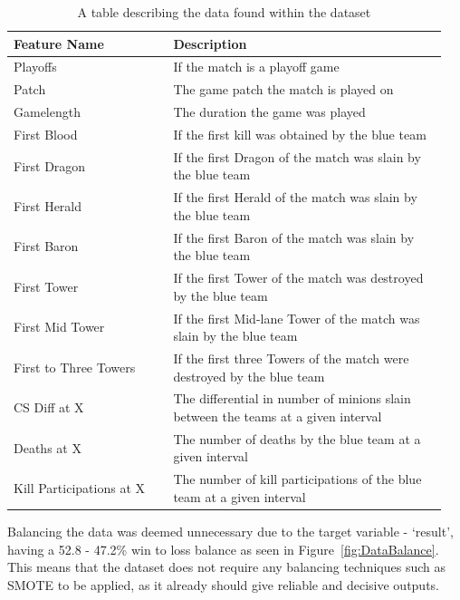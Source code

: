 \begin{table}[h]
    \centering
    \caption{A table describing the data found within the dataset}
    \begin{tabular}{p{0.35\linewidth} p{0.6\linewidth}}
        \toprule
        \textbf{Feature Name} & \textbf{Description} \\
        \midrule
        Playoffs & If the match is a playoff game  \\
        Patch & The game patch the match is played on  \\
        Gamelength & The duration the game was played  \\
        First Blood & If the first kill was obtained by the blue team   \\
        First Dragon & If the first Dragon of the match was slain by the blue team   \\
        First Herald & If the first Herald of the match was slain by the blue team    \\
        First Baron & If the first Baron of the match was slain by the blue team   \\
        First Tower & If the first Tower of the match was destroyed by the blue team    \\
        First Mid Tower & If the first Mid-lane Tower of the match was slain by the blue team \\
        First to Three Towers & If the first three Towers of the match were destroyed by the blue team  \\
        CS Diff at X & The differential in number of minions slain between the teams at a given interval  \\
        Deaths at X & The number of deaths by the blue team at a given interval \\
        Kill Participations at X & The number of kill participations of the blue team at a given interval  \\
        \bottomrule
    \end{tabular}
    \label{tab:DataDescription}
\end{table}


Balancing the data was deemed unnecessary due to the target variable - `result', having a 52.8 - 47.2\% win to loss balance as seen in Figure~\ref{fig:DataBalance}.
This means that the dataset does not require any balancing techniques such as SMOTE to be applied, as it already should give reliable and decisive outputs.

